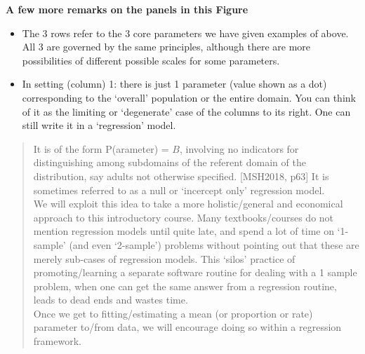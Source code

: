 \documentclass[]{book}
\begin{document}
\textbf{A few more remarks on the panels in this Figure}

\begin{itemize}
\item
  The 3 rows refer to the 3 core parameters we have given examples of above. All 3 are governed by the same principles, although there are more possibilities of different possible scales for some parameters.
\item
  In setting (column) 1: there is just 1 parameter (value shown as a dot) corresponding to the `overall' population or the entire domain. You can think of it as the limiting or `degenerate' case of the columns to its right. One can still write it in a `regression' model.
\end{itemize}

\begin{quote}
It is of the form P(arameter) = \(B\), involving no indicators for distinguishing among subdomains of the referent domain of the distribution, say adults not otherwise specified. {[}MSH2018, p63{]}
It is sometimes referred to as a null or `incercept only' regression model.\\
\hspace*{0.333em}\hspace*{0.333em}\hspace*{0.333em}\hspace*{0.333em}We will exploit this idea to take a more holistic/general and economical approach to this introductory course. Many textbooks/courses do not mention regression models until quite late, and spend a lot of time on `1-sample' (and even `2-sample') problems without pointing out that these are merely sub-cases of regression models. This `silos' practice of promoting/learning a separate software routine for dealing with a 1 sample problem, when one can get the same answer from a regression routine, leads to dead ends and wastes time.\\
\hspace*{0.333em}\hspace*{0.333em}\hspace*{0.333em}\hspace*{0.333em}Once we get to fitting/estimating a mean (or proportion or rate) parameter to/from data, we will encourage doing so within a regression framework.
\end{quote}
\end{document}
